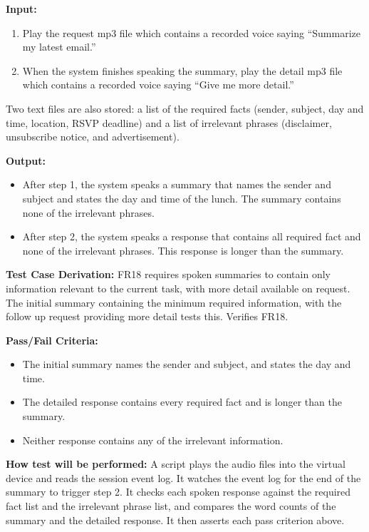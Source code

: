 \documentclass[12pt, titlepage]{article}
\begin{document}
\begin{enumerate}
\textbf{Input:}
\begin{enumerate}
  \item Play the request mp3 file which contains a recorded voice saying ``Summarize my latest email.''
  \item When the system finishes speaking the summary, play the detail mp3 file
  which contains a recorded voice saying ``Give me more detail.''
\end{enumerate}
Two text files are also stored: a list of the required facts (sender, subject, day and time, location, RSVP deadline) and a list of irrelevant phrases (disclaimer, unsubscribe notice, and advertisement).

\textbf{Output:}
\begin{itemize}
  \item After step 1, the system speaks a summary that names the sender and subject and states the day and time of the lunch. The summary contains none of the irrelevant phrases.
  \item After step 2, the system speaks a response that contains all required fact and none of the irrelevant phrases. This response is longer than the summary.
\end{itemize}

\textbf{Test Case Derivation:} FR18 requires spoken summaries to contain only information relevant to the current task, with more detail available on request. 
The initial summary containing the minimum required information, with the follow up request providing more detail tests this. Verifies FR18.

\textbf{Pass/Fail Criteria:}
\begin{itemize}
  \item The initial summary names the sender and subject, and states the day and time.
  \item The detailed response contains every required fact and is longer than the summary.
  \item Neither response contains any of the irrelevant information.
\end{itemize}

\textbf{How test will be performed:} A script plays the audio files into the
virtual device and reads the session event log. It watches the event log for the end of the summary to trigger step 2. It checks each spoken response against the required fact list and the irrelevant phrase list, and compares the word counts of the summary and the detailed response. It then asserts each pass criterion above.

\end{enumerate}
\end{document}
